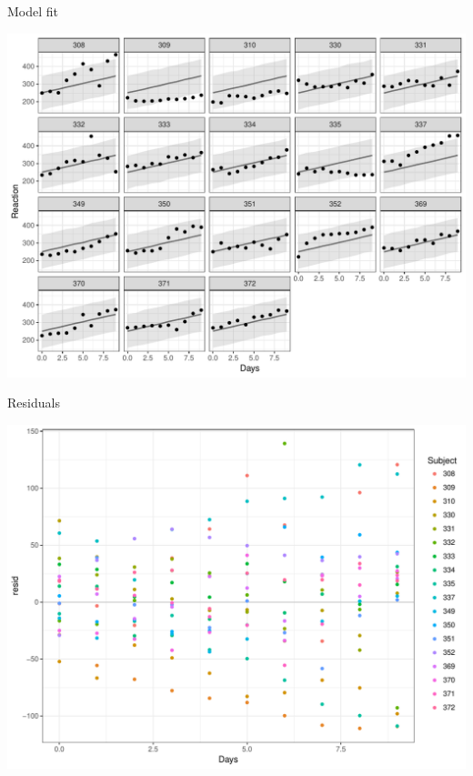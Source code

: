 \documentclass[11pt,ignorenonframetext,]{beamer}
\begin{document}
\begin{frame}{Model fit}

\includegraphics{Lec5_files/figure-beamer/unnamed-chunk-8-1.pdf}

\end{frame}

\begin{frame}{Residuals}

\includegraphics{Lec5_files/figure-beamer/unnamed-chunk-9-1.pdf}

\end{frame}
\end{document}
